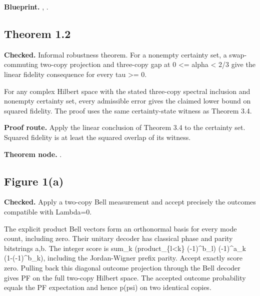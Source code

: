 \textbf{Blueprint.} , .

\subsection{Theorem 1.2}\label{paper:r1-2}
\textbf{Checked.} Informal robustness theorem. For a nonempty certainty set, a swap-commuting two-copy projection and three-copy gap at 0 <= alpha < 2/3 give the linear fidelity consequence for every tau >= 0. 

For any complex Hilbert space with the stated three-copy spectral inclusion and nonempty certainty set, every admissible error gives the claimed lower bound on squared fidelity. The proof uses the same certainty-state witness as Theorem 3.4.

\textbf{Proof route.} Apply the linear conclusion of Theorem 3.4 to the certainty set. Squared fidelity is at least the squared overlap of its witness.


\textbf{Theorem node.} .

\subsection{Figure 1(a)}\label{paper:f1a}
\textbf{Checked.} Apply a two-copy Bell measurement and accept precisely the outcomes compatible with Lambda=0. 

The explicit product Bell vectors form an orthonormal basis for every mode count, including zero. Their unitary decoder has classical phase and parity bitstrings a,b. The integer score is sum\_k (product\_\{l<k\} (-1)\textasciicircum{}b\_l) (-1)\textasciicircum{}a\_k (1-(-1)\textasciicircum{}b\_k), including the Jordan-Wigner prefix parity. Accept exactly score zero. Pulling back this diagonal outcome projection through the Bell decoder gives PF on the full two-copy Hilbert space. The accepted outcome probability equals the PF expectation and hence p(psi) on two identical copies.


